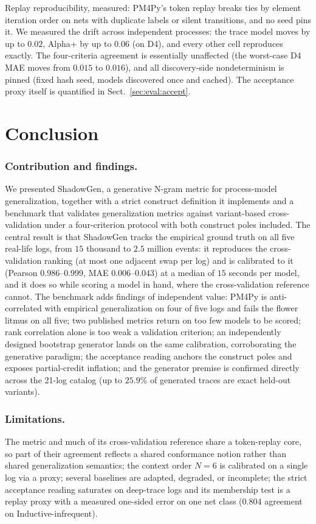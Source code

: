 \documentclass[runningheads]{llncs}
\newcommand{\chg}[1]{\textcolor{chgblue}{#1}}
\begin{document}
\chg{Replay reproducibility, measured: PM4Py's token replay breaks ties by element iteration order on nets with duplicate labels or silent transitions, and no seed pins it. We measured the drift across independent processes: the trace model moves by up to $0.02$, Alpha+ by up to $0.06$ (on D4), and every other cell reproduces exactly. The four-criteria agreement is essentially unaffected (the worst-case D4 MAE moves from $0.015$ to $0.016$), and all discovery-side nondeterminism is pinned (fixed hash seed, models discovered once and cached). The acceptance proxy itself is quantified in Sect.~\ref{sec:eval:accept}.}

\section{Conclusion}
\label{sec:conclusion}

\subsubsection{Contribution and findings.}
We presented ShadowGen, a generative N-gram metric for process-model generalization, together with a strict construct definition it implements and a benchmark that validates generalization metrics against variant-based cross-validation under a four-criterion protocol with both construct poles included. \chg{The central result is that ShadowGen tracks the empirical ground truth on all five real-life logs, from $15$ thousand to $2.5$ million events: it reproduces the cross-validation ranking (at most one adjacent swap per log) and is calibrated to it (Pearson $0.986$--$0.999$, MAE $0.006$--$0.043$) at a median of $15$ seconds per model, and it does so while scoring a model in hand, where the cross-validation reference cannot. The benchmark adds findings of independent value: PM4Py is anti-correlated with empirical generalization on four of five logs and fails the flower litmus on all five; two published metrics return on too few models to be scored; rank correlation alone is too weak a validation criterion; an independently designed bootstrap generator lands on the same calibration, corroborating the generative paradigm; the acceptance reading anchors the construct poles and exposes partial-credit inflation; and the generator premise is confirmed directly across the 21-log catalog (up to $25.9\%$ of generated traces are exact held-out variants).}

\subsubsection{Limitations.}
The metric and much of its cross-validation reference share a token-replay core, so part of their agreement reflects a shared conformance notion rather than shared generalization semantics; the context order $N{=}6$ is calibrated on a single log via a proxy; several baselines are adapted, degraded, or incomplete\chg{; the strict acceptance reading saturates on deep-trace logs and its membership test is a replay proxy with a measured one-sided error on one net class ($0.804$ agreement on Inductive-infrequent)}.
\end{document}

